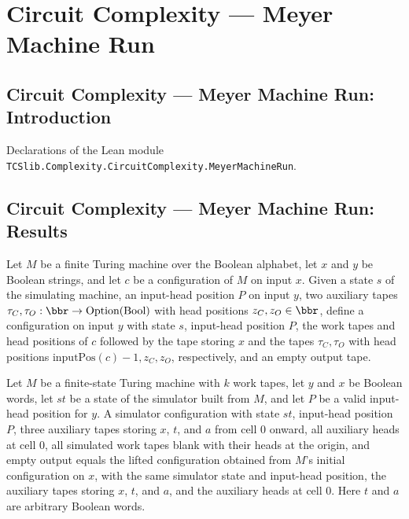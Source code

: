 \section{Circuit Complexity --- Meyer Machine Run}
\subsection*{Circuit Complexity --- Meyer Machine Run: Introduction}

Declarations of the Lean module \texttt{TCSlib.Complexity.CircuitComplexity.MeyerMachineRun}.

\subsection*{Circuit Complexity --- Meyer Machine Run: Results}

\begin{definition}
\label{Complexity.Meyer.lcfg}
\leanok
{}
Let $M$ be a finite Turing machine over the Boolean alphabet, let $x$ and $y$ be Boolean
strings, and let $c$ be a configuration of $M$ on input $x$. Given a state $s$ of the
simulating machine, an input-head position $P$ on input $y$, two auxiliary tapes
$\tau_C,\tau_O:\bbr\to\text{Option}(\text{Bool})$ with head positions
$z_C,z_O\in\bbr$, define a configuration on input $y$ with state $s$,
input-head position $P$, the work tapes and head positions of $c$ followed by the tape
storing $x$ and the tapes $\tau_C,\tau_O$ with head positions
$\text{inputPos}(c)-1,z_C,z_O$, respectively, and an empty output tape.
\end{definition}

\begin{theorem}
\label{Complexity.Meyer.acfg_eq_lcfg}
\leanok
{}
Let $M$ be a finite-state Turing machine with $k$ work tapes, let $y$ and $x$ be Boolean
words, let $st$ be a state of the simulator built from $M$, and let $P$ be a valid
input-head position for $y$. A simulator configuration with state $st$, input-head
position $P$, three auxiliary tapes storing $x$, $t$, and $a$ from cell $0$ onward, all
auxiliary heads at cell $0$, all simulated work tapes blank with their heads at the
origin, and empty output equals the lifted configuration obtained from $M$'s initial
configuration on $x$, with the same simulator state and input-head position, the
auxiliary tapes storing $x$, $t$, and $a$, and the auxiliary heads at cell $0$. Here $t$
and $a$ are arbitrary Boolean words.
\end{theorem}

